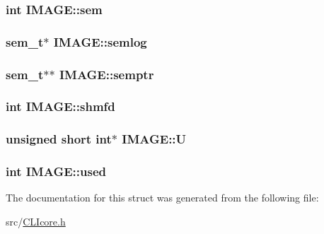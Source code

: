 \hypertarget{structIMAGE_a6a50020081f8e319972497690237fb66}{
\subsubsection[{sem}]{\setlength{\rightskip}{0pt plus 5cm}int I\+M\+A\+G\+E\+::sem}}\label{structIMAGE_a6a50020081f8e319972497690237fb66}
\hypertarget{structIMAGE_a9862b2c9defbf6a47a982da827048ed1}{
\subsubsection[{semlog}]{\setlength{\rightskip}{0pt plus 5cm}sem\+\_\+t$\ast$ I\+M\+A\+G\+E\+::semlog}}\label{structIMAGE_a9862b2c9defbf6a47a982da827048ed1}
\hypertarget{structIMAGE_a85b29e7531f0e07a5f68dbea97a14477}{
\subsubsection[{semptr}]{\setlength{\rightskip}{0pt plus 5cm}sem\+\_\+t$\ast$$\ast$ I\+M\+A\+G\+E\+::semptr}}\label{structIMAGE_a85b29e7531f0e07a5f68dbea97a14477}
\hypertarget{structIMAGE_aa1de16f9b739720f6de65389f63d8229}{
\subsubsection[{shmfd}]{\setlength{\rightskip}{0pt plus 5cm}int I\+M\+A\+G\+E\+::shmfd}}\label{structIMAGE_aa1de16f9b739720f6de65389f63d8229}
\hypertarget{structIMAGE_a0e75d3dd1879fa0d0fa9caaa80a1074a}{
\subsubsection[{U}]{\setlength{\rightskip}{0pt plus 5cm}unsigned short int$\ast$ I\+M\+A\+G\+E\+::\+U}}\label{structIMAGE_a0e75d3dd1879fa0d0fa9caaa80a1074a}
\hypertarget{structIMAGE_aca4f71f11b37d19c782813e3be7dee49}{
\subsubsection[{used}]{\setlength{\rightskip}{0pt plus 5cm}int I\+M\+A\+G\+E\+::used}}\label{structIMAGE_aca4f71f11b37d19c782813e3be7dee49}


The documentation for this struct was generated from the following file\+:\begin{DoxyCompactItemize}
\item 
src/\hyperlink{CLIcore_8h}{C\+L\+Icore.\+h}\end{DoxyCompactItemize}

